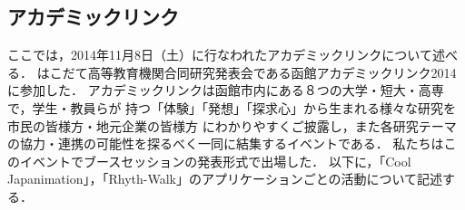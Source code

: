 \subsection{アカデミックリンク}
\par
ここでは，2014年11月8日（土）に行なわれたアカデミックリンクについて述べる．
はこだて高等教育機関合同研究発表会である函館アカデミックリンク2014に参加した．
アカデミックリンクは函館市内にある８つの大学・短大・高専で，学生・教員らが
持つ「体験」「発想」「探求心」から生まれる様々な研究を市民の皆様方・地元企業の皆様方
にわかりやすくご披露し，また各研究テーマの協力・連携の可能性を探るべく一同に結集するイベントである．
私たちはこのイベントでブースセッションの発表形式で出場した．
以下に，「Cool Japanimation」，「Rhyth-Walk」のアプリケーションごとの活動について記述する．


